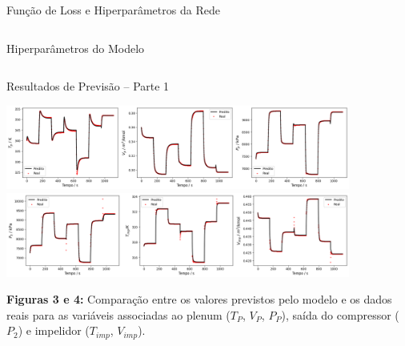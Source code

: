 \begin{frame}{Função de Loss e Hiperparâmetros da Rede}
\begin{columns}[T]
        \begin{column}{0.45\textwidth}
            \vspace{2.5cm}
            \begin{block}{\centering Hiperparâmetros do Modelo}
                \footnotesize
                \centering
            \end{block}
        \end{column}
    \end{columns}
\end{frame}


\begin{frame}{Resultados de Previsão – Parte 1}
\scriptsize

\begin{center}
    \includegraphics[width=0.85\textwidth]{figures/dados1.png} \\
    \includegraphics[width=0.85\textwidth]{figures/dados2.png}
\end{center}

{\centering
\tiny
\textbf{Figuras 3 e 4:} Comparação entre os valores previstos pelo modelo e os dados reais para as variáveis associadas ao plenum (\(T_P\), \(V_P\), \(P_P\)), saída do compressor (\(P_2\)) e impelidor (\(T_{imp}\), \(V_{imp}\)).
}

\end{frame}

